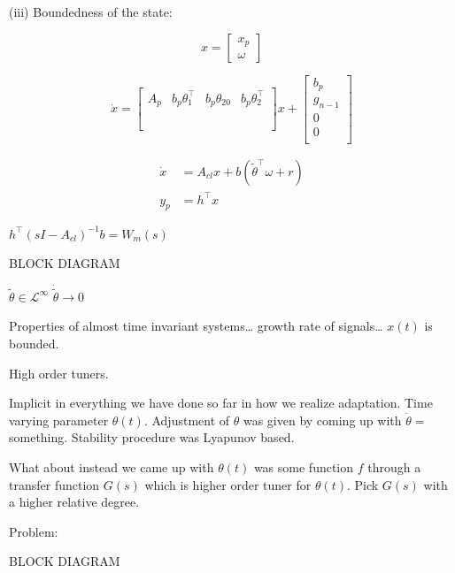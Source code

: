 (iii) Boundedness of the state:

\begin{equation*}
  x=
  \begin{bmatrix}
    x_{p} \\
    \omega
  \end{bmatrix}
\end{equation*}

\begin{equation*}
  \dot{x}=
  \begin{bmatrix}
    A_{p} & b_{p}\theta_{1}^{\top} & b_{p}\theta_{20} & b_{p}\theta_{2}^{\top} \\
    & & & \\
    & & & \\
    & & & \\
  \end{bmatrix}
  x+
  \begin{bmatrix}
    b_{p} \\
    g_{n-1} \\
    0 \\
    0 \\
  \end{bmatrix}
\end{equation*}

\begin{align*}
  \dot{x}&=A_{cl}x+b(\tilde{\theta}^{\top}\omega+r) \\
  y_{p}&=h^{\top}x
\end{align*}

$h^{\top}(sI-A_{cl})^{-1}b=W_{m}(s)$

BLOCK DIAGRAM

$\tilde{\theta}\in\mathcal{L}^{\infty}$
$\dot{\tilde{\theta}}\rightarrow0$

Properties of almost time invariant systems\ldots
growth rate of signals\ldots
$x(t)$ is bounded.

High order tuners.

Implicit in everything we have done so far in how we realize adaptation.
Time varying parameter $\theta(t)$.
Adjustment of $\theta$ was given by coming up with $\dot{\theta}=$something.
Stability procedure was Lyapunov based.

What about instead we came up with $\theta(t)$ was some function $f$ through a transfer function $G(s)$ which is higher order tuner for $\theta(t)$.
Pick $G(s)$ with a higher relative degree.

Problem:

BLOCK DIAGRAM

